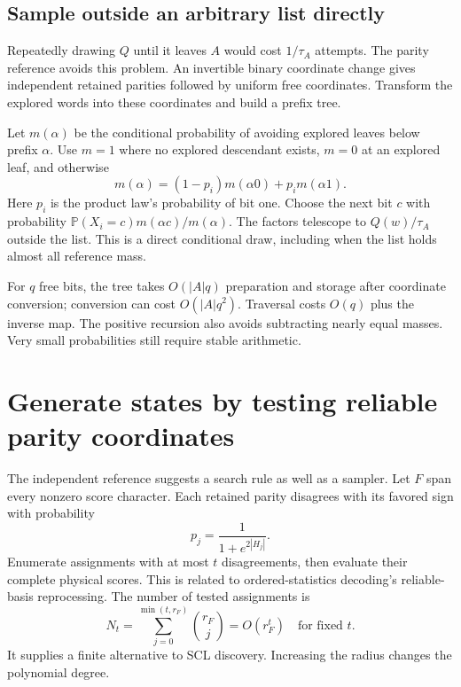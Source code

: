 \documentclass[10pt,a4paper]{article}
\newcommand{\Prb}{\mathbb P}
\begin{document}
\subsection{Sample outside an arbitrary list directly}
Repeatedly drawing $Q$ until it leaves $A$ would cost $1/\tau_A$ attempts. The parity reference avoids
this problem. An invertible binary coordinate change gives independent retained parities followed by
uniform free coordinates. Transform the explored words into these coordinates and build a prefix tree.

Let $m(\alpha)$ be the conditional probability of avoiding explored leaves below prefix $\alpha$.
Use $m=1$ where no explored descendant exists, $m=0$ at an explored leaf, and otherwise
\begin{equation}
 m(\alpha)=(1-p_i)m(\alpha0)+p_i m(\alpha1).
 \label{eq:complement}
\end{equation}
Here $p_i$ is the product law's probability of bit one. Choose the next bit $c$ with probability
$\Prb(X_i=c)m(\alpha c)/m(\alpha)$. The factors telescope to $Q(w)/\tau_A$ outside the list.
This is a direct conditional draw, including when the list holds almost all reference mass.

For $q$ free bits, the tree takes $O(|A|q)$ preparation and storage after coordinate conversion;
conversion can cost $O(|A|q^2)$. Traversal costs $O(q)$ plus the inverse map. The positive recursion
also avoids subtracting nearly equal masses. Very small probabilities still require stable arithmetic.

\section{Generate states by testing reliable parity coordinates}
\label{sec:flips}
The independent reference suggests a search rule as well as a sampler. Let $F$ span every nonzero
score character. Each retained parity disagrees with its favored sign with probability
\[
 p_j=\frac1{1+e^{2|H_j|}}.
\]
Enumerate assignments with at most $t$ disagreements, then evaluate their complete physical scores.
This is related to ordered-statistics decoding's reliable-basis reprocessing\cite{fossorier}.
The number of tested assignments is
\begin{equation}
 N_t=\sum_{j=0}^{\min(t,r_F)}\binom{r_F}{j}=O(r_F^t)\quad\text{for fixed }t.
 \label{eq:flips}
\end{equation}
It supplies a finite alternative to SCL discovery. Increasing the radius changes the polynomial degree.
\end{document}
